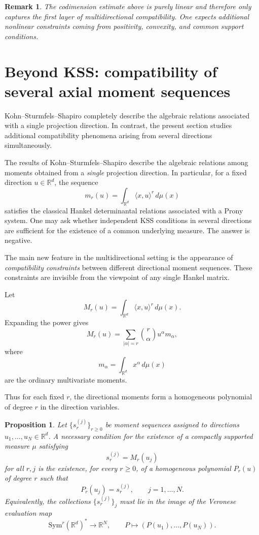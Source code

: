 \documentclass[reqno]{amsart}
\numberwithin{theorem}{section}
\newtheorem{proposition}[theorem]{Proposition}
\newtheorem{remark}[theorem]{Remark}
\newcommand{\RR}{\mathbb{R}}
\begin{document}
\begin{remark}
The codimension estimate above is purely linear and therefore only captures
the first layer of multidirectional compatibility.  One expects additional
nonlinear constraints coming from positivity, convexity, and common support
conditions.
\end{remark}


\section{Beyond KSS: compatibility of several axial moment sequences}

\noindent
Kohn--Sturmfels--Shapiro \cite{KSS} completely describe the algebraic relations associated with a single projection direction. In contrast, the present section studies additional compatibility phenomena arising from several directions simultaneously.



The results of Kohn--Sturmfels--Shapiro describe the algebraic relations
among moments obtained from a \emph{single} projection direction.  In
particular, for a fixed direction $u\in \RR^d$, the sequence
\[
m_r(u)=\int_{\RR^d} \langle x,u\rangle^r\, d\mu(x)
\]
satisfies the classical Hankel determinantal relations associated with a
Prony system.  One may ask whether independent KSS conditions in several
directions are sufficient for the existence of a common underlying measure.
The answer is negative.

The main new feature in the multidirectional setting is the appearance of
\emph{compatibility constraints} between different directional moment
sequences.  These constraints are invisible from the viewpoint of any single
Hankel matrix.

Let
\[
M_r(u)=\int_{\RR^d} \langle x,u\rangle^r\, d\mu(x).
\]
Expanding the power gives
\[
M_r(u)=
\sum_{|\alpha|=r}
\binom{r}{\alpha}
u^\alpha m_\alpha,
\]
where
\[
m_\alpha=\int_{\RR^d} x^\alpha\, d\mu(x)
\]
are the ordinary multivariate moments.

Thus for each fixed $r$, the directional moments form a homogeneous
polynomial of degree $r$ in the direction variables.

\begin{proposition}\label{pr:compatibility}
Let $\{s_r^{(j)}\}_{r\ge0}$ be moment sequences assigned to directions
$u_1,\dots,u_N\in\RR^d$.  A necessary condition for the existence of a
compactly supported measure $\mu$ satisfying
\[
s_r^{(j)}=M_r(u_j)
\]
for all $r,j$ is the existence, for every $r\ge0$, of a homogeneous
polynomial $P_r(u)$ of degree $r$ such that
\[
P_r(u_j)=s_r^{(j)},\qquad j=1,\dots,N.
\]
Equivalently, the collections $\{s_r^{(j)}\}_j$ must lie in the image of
the Veronese evaluation map
\[
\mathrm{Sym}^r(\RR^d)^*
\longrightarrow
\RR^N,
\qquad
P\mapsto (P(u_1),\dots,P(u_N)).
\]
\end{proposition}
\end{document}
